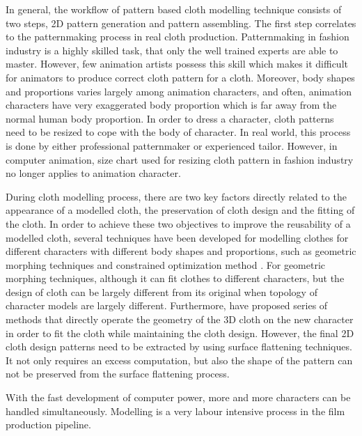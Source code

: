 In general, the workflow of pattern based cloth modelling technique consists of two steps, 2D pattern generation and pattern assembling. The first step correlates to the patternmaking process in real cloth production. Patternmaking in fashion industry is a highly skilled task, that only the well trained experts are able to master. However, few animation artists possess this skill which makes it difficult for animators to produce correct cloth pattern for a cloth. Moreover, body shapes and proportions varies largely among animation characters, and often, animation characters have very exaggerated body proportion which is far away from the normal human body proportion. In order to dress a character, cloth patterns need to be resized to cope with the body of character. In real world, this process is done by either professional patternmaker or experienced tailor. However, in computer animation, size chart used for resizing cloth pattern in fashion industry no longer applies to animation character.  

During cloth modelling process, there are two key factors directly related to the appearance of a modelled cloth, the preservation of cloth design and the fitting of the cloth. In order to achieve these two objectives to improve the reusability of a modelled cloth, several techniques have been developed for modelling clothes for different characters with different body shapes and proportions, such as geometric morphing techniques  and constrained optimization method . For geometric morphing techniques, although it can fit clothes to different characters, but the design of cloth can be largely different from its original when topology of character models are largely different. Furthermore,  have proposed series of methods that directly operate the geometry of the 3D cloth on the new character in order to fit the cloth while maintaining the cloth design. However, the final 2D cloth design patterns need to be extracted by using surface flattening techniques. It not only requires an excess computation, but also the shape of the pattern can not be preserved from the surface flattening process.

With the fast development of computer power, more and more characters can be handled simultaneously. Modelling is a very labour intensive process in the film production pipeline.


